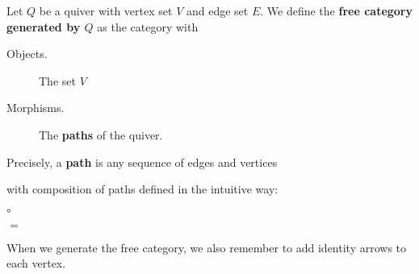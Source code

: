     \begin{definition}
        Let $Q$ be a quiver with vertex set $V$ and edge set $E$. 
        We define the \textbf{free category generated by $Q$} as 
        the category with 
        \begin{description}
            \item[Objects.] The set $V$ 
            \item[Morphisms.] The \textbf{paths} of the quiver.   
        \end{description}
        Precisely, a \textbf{path} is any sequence of edges and vertices 
        \begin{center}
        \end{center}
        with composition of paths defined in the intuitive way: 
        \begin{center}
            $\circ$
        \end{center}
        \begin{center}
            $=$
        \end{center}
        When we generate the free category, we also remember to add identity arrows to 
        each vertex. 
    \end{definition}

